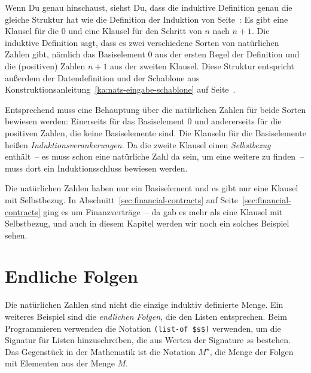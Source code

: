Wenn Du genau hinschaust, siehst Du, dass die induktive Definition genau die
gleiche Struktur hat wie die Definition der Induktion von
Seite~\pageref{page:mathematical-induction}: Es gibt eine Klausel für
die $0$ und eine Klausel für den Schritt von $n$ nach $n+1$.  Die induktive
Definition sagt, dass es zwei verschiedene Sorten von natürlichen
Zahlen gibt, nämlich das Basiselement $0$ aus der ersten Regel der
Definition und die (positiven) Zahlen $n+1$ aus der zweiten Klausel.
Diese Struktur entspricht außerdem der Datendefinition und der Schablone aus
Konstruktionsanleitung~\ref{ka:nats-eingabe-schablone} auf
Seite~\pageref{ka:nats-eingabe-schablone}.

Entsprechend muss eine Behauptung über die natürlichen Zahlen für beide
Sorten bewiesen werden: Einerseits für das Basiselement $0$ und
andererseits für die positiven Zahlen, die keine Basiselemente sind.
Die Klauseln für die Basiselemente heißen
\textit{Induktionsverankerungen}.  Da die
zweite Klausel einen \textit{Selbstbezug}
enthält~-- es muss schon eine natürliche Zahl da sein, um eine weitere
zu finden~-- muss dort ein Induktionsschluss bewiesen werden.

Die natürlichen Zahlen haben nur ein Basiselement und es gibt nur eine
Klausel mit Selbstbezug.  In Abschnitt~\ref{sec:financial-contracts} auf
Seite~\ref{sec:financial-contracts} ging es um Finanzverträge~-- da
gab es mehr als eine Klausel mit Selbstbezug, und auch in diesem
Kapitel werden wir noch ein solches Beispiel sehen.

\section{Endliche Folgen}
\label{sec:finite-sequences}

Die natürlichen Zahlen sind nicht die einzige induktiv definierte
Menge.  Ein weiteres Beispiel sind die \textit{endlichen Folgen}, die den Listen entsprechen.  Beim
Programmieren verwenden die Notation \lstinline{(list-of $s$)}
verwenden, um die Signatur für Listen hinzuschreiben, die aus Werten
der Signature $s$s bestehen.  Das Gegenstück in der Mathematik ist die
Notation $M^\star$, die Menge der Folgen mit Elementen aus der Menge
$M$.

